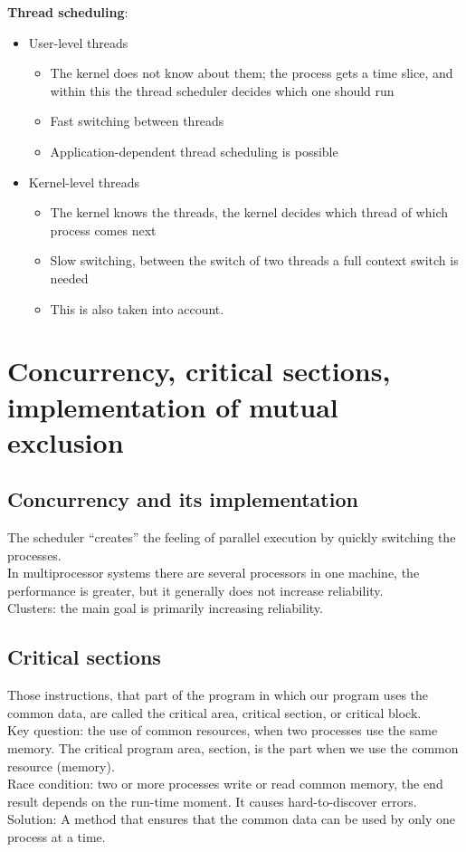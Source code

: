 \documentclass[margin=0px]{article}
\begin{document}
\textbf{Thread scheduling}:
\begin{itemize}
    \item User-level threads
          \begin{itemize}
              \item The kernel does not know about them; the process gets a time slice, and within this the thread scheduler decides which one should run
              \item Fast switching between threads
              \item Application-dependent thread scheduling is possible
          \end{itemize}
    \item Kernel-level threads
          \begin{itemize}
              \item The kernel knows the threads, the kernel decides which thread of which process comes next
              \item Slow switching, between the switch of two threads a full context switch is needed
              \item This is also taken into account.
          \end{itemize}
\end{itemize}

\section{Concurrency, critical sections, implementation of mutual exclusion}

\subsection{Concurrency and its implementation}

The scheduler ``creates'' the feeling of parallel execution by quickly switching the processes. \\
In multiprocessor systems there are several processors in one machine, the performance is greater, but it generally does not increase reliability. \\
Clusters: the main goal is primarily increasing reliability.

\subsection{Critical sections}

Those instructions, that part of the program in which our program uses the common data, are called the critical area, critical section, or critical block. \\
Key question: the use of common resources, when two processes use the same memory. The critical program area, section, is the part when we use the common resource (memory). \\
Race condition: two or more processes write or read common memory, the end result depends on the run-time moment. It causes hard-to-discover errors. \\
Solution: A method that ensures that the common data can be used by only one process at a time.
\end{document}
